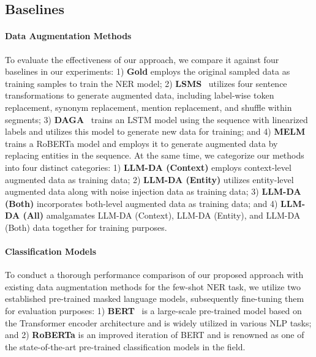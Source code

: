 \documentclass[11pt]{article}
\begin{document}
\subsection{Baselines}
\paragraph{Data Augmentation Methods}
To evaluate the effectiveness of our approach, we compare it against four baselines in our experiments:
1) \textbf{Gold} employs the original sampled data as training samples to train the NER model;
2) \textbf{LSMS}~\cite{LSMS} utilizes four sentence transformations to generate augmented data, including label-wise token replacement, synonym replacement, mention replacement, and shuffle within segments;
3) \textbf{DAGA}~\cite{DAGA} trains an LSTM model using the sequence with linearized labels and utilizes this model to generate new data for training;
and 4) \textbf{MELM}~\cite{MELM} trains a RoBERTa model and employs it to generate augmented data by replacing entities in the sequence.
At the same time, we categorize our methods into four distinct categories:
1) \textbf{LLM-DA (Context)} employs context-level augmented data as training data;
2) \textbf{LLM-DA (Entity)} utilizes entity-level augmented data along with noise injection data as training data;
3) \textbf{LLM-DA (Both)} incorporates both-level augmented data as training data;
and 4) \textbf{LLM-DA (All)} amalgamates LLM-DA (Context), LLM-DA (Entity), and LLM-DA (Both) data together for training purposes.



\paragraph{Classification Models}
To conduct a thorough performance comparison of our proposed approach with existing data augmentation methods for the few-shot NER task, we utilize two established pre-trained masked language models, subsequently fine-tuning them for evaluation purposes:
1) \textbf{BERT}~\cite{BERT} is a large-scale pre-trained model based on the Transformer \cite{transformers} encoder architecture and is widely utilized in various NLP tasks;
and 2) \textbf{RoBERTa} is an improved iteration of BERT and is renowned as one of the state-of-the-art pre-trained classification models in the field.
\end{document}
